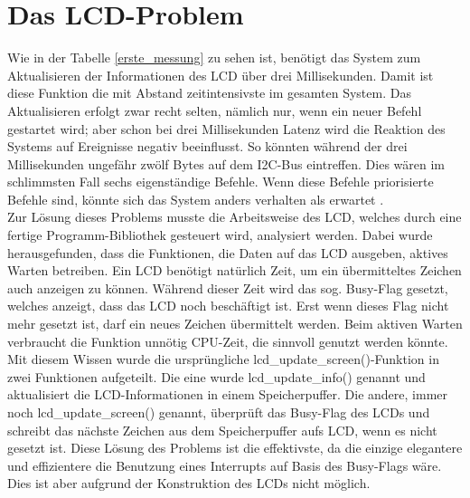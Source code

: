 \section{Das LCD-Problem\label{chapter_lcd_problem}}
Wie in der Tabelle \ref{erste_messung} zu sehen ist, benötigt das System zum Aktualisieren der Informationen
des LCD über drei Millisekunden. Damit ist diese Funktion die mit Abstand zeitintensivste im gesamten System.
Das Aktualisieren erfolgt zwar recht selten, nämlich nur, wenn ein neuer Befehl gestartet wird; aber schon
bei drei Millisekunden Latenz wird die Reaktion des Systems auf Ereignisse negativ beeinflusst.
So könnten während der drei Millisekunden ungefähr zwölf Bytes auf dem I2C-Bus eintreffen.
Dies wären im schlimmsten Fall sechs eigenständige Befehle.
Wenn diese Befehle priorisierte Befehle sind, könnte sich das System anders verhalten als erwartet .\\
Zur Lösung dieses Problems musste die Arbeitsweise des LCD, welches durch eine fertige Programm-Bibliothek
gesteuert wird, analysiert werden. 
Dabei wurde herausgefunden, dass die Funktionen, die Daten auf das LCD ausgeben,
aktives Warten betreiben. Ein LCD benötigt natürlich Zeit, um ein übermitteltes Zeichen auch anzeigen zu können.
Während dieser Zeit wird das sog. Busy-Flag gesetzt, welches anzeigt, dass das LCD noch beschäftigt ist. Erst
wenn dieses Flag nicht mehr gesetzt ist, darf ein neues Zeichen übermittelt werden. Beim aktiven Warten verbraucht die
Funktion unnötig CPU-Zeit, die sinnvoll genutzt werden könnte.\\
Mit diesem Wissen wurde die ursprüngliche lcd\_\-update\_\-screen()-Funktion in zwei Funktionen aufgeteilt. Die eine
wurde lcd\_\-update\_\-info() genannt und aktualisiert die LCD-Informationen in einem Speicherpuffer. Die andere,
immer noch lcd\_\-update\_\-screen() genannt, überprüft das Busy-Flag des LCDs und schreibt das nächste Zeichen aus
dem Speicherpuffer aufs LCD, wenn es nicht gesetzt ist. Diese Lösung des Problems ist die effektivste, da die einzige
elegantere und effizientere die Benutzung eines Interrupts auf Basis des Busy-Flags wäre. Dies ist aber aufgrund der
Konstruktion des LCDs nicht möglich.

